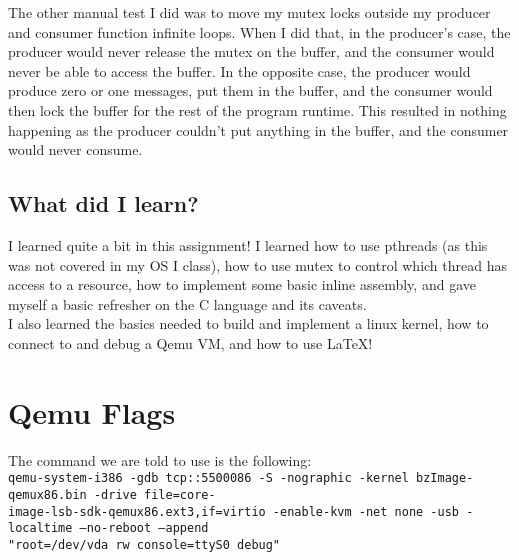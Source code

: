 \documentclass[10pt,letterpaper]{article}
\begin{document}
  \noindent The other manual test I did was to move my mutex locks outside my
  producer and consumer function infinite loops. When I did that, in the producer's
  case, the producer would never release the mutex on the buffer, and the consumer
  would never be able to access the buffer. In the opposite case, the producer
  would produce zero or one messages, put them in the buffer, and the consumer
  would then lock the buffer for the rest of the program runtime. This resulted
  in nothing happening as the producer couldn't put anything in the buffer, and
  the consumer would never consume.

  \subsection{What did I learn?}
  I learned quite a bit in this assignment! I learned how to use pthreads (as this
  was not covered in my OS I class), how to use mutex to control which thread
  has access to a resource, how to implement some basic inline assembly, and
  gave myself a basic refresher on the C language and its caveats. \\

  \noindent I also learned the basics needed to build and implement a linux kernel,
  how to connect to and debug a Qemu VM, and how to use \LaTeX{}!

\section{Qemu Flags}
  The command we are told to use is the following: \\

  \noindent \texttt{qemu-system-i386 -gdb tcp::5500086 -S -nographic -kernel
      bzImage-qemux86.bin -drive file=core-\\image-lsb-sdk-qemux86.ext3,if=virtio
      -enable-kvm -net none -usb -localtime --no-reboot --append\\ "root=/dev/vda
      rw console=ttyS0 debug"} \\
\end{document}
